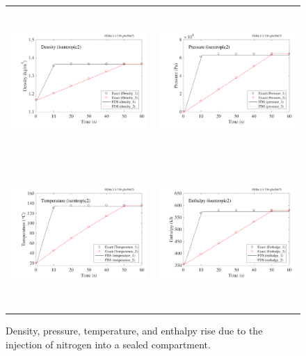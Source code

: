 \documentclass[11pt]{book}
\begin{document}
\begin{figure}[ht]
\begin{tabular*}{\textwidth}{lr}
\includegraphics[height=2.2in]{SCRIPT_FIGURES/isentropic2_density} &
\includegraphics[height=2.2in]{SCRIPT_FIGURES/isentropic2_pressure} \\
\includegraphics[height=2.2in]{SCRIPT_FIGURES/isentropic2_temperature} &
\includegraphics[height=2.2in]{SCRIPT_FIGURES/isentropic2_enthalpy}
\end{tabular*}
\caption[The  test case]{Density, pressure, temperature, and enthalpy rise due to the injection of nitrogen into a sealed compartment.}
\label{isentropic2_fig}
\end{figure}
\end{document}
